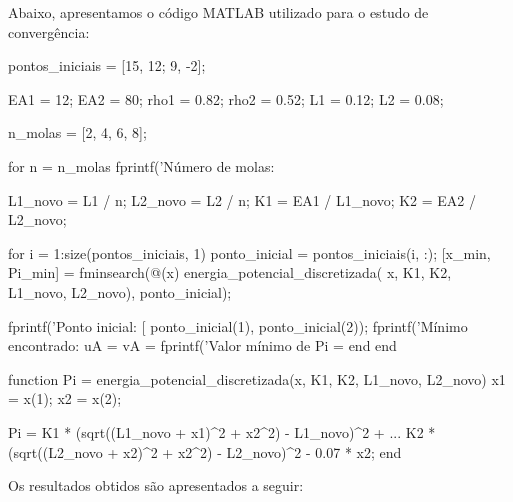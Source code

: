 \documentclass[a4paper, 12pt]{article}
\begin{document}
Abaixo, apresentamos o código MATLAB utilizado para o estudo de convergência:

\sloppy
{}
\graphicspath{ {./L01_Latex_images/} }
\begin{matlabcode}

pontos_iniciais = [15, 12; 9, -2];

EA1 = 12; %
EA2 = 80; %
rho1 = 0.82; %
rho2 = 0.52; %
L1 = 0.12; %
L2 = 0.08; %

n_molas = [2, 4, 6, 8];

for n = n_molas
    fprintf('Número de molas: %
    
    L1_novo = L1 / n;
    L2_novo = L2 / n;
    K1 = EA1 / L1_novo;
    K2 = EA2 / L2_novo;
    
    for i = 1:size(pontos_iniciais, 1)
        ponto_inicial = pontos_iniciais(i, :);
        [x_min, Pi_min] = fminsearch(@(x) energia_potencial_discretizada(
        x, K1, K2, L1_novo, L2_novo), 
        ponto_inicial);
        
        fprintf('Ponto inicial: [%
        ponto_inicial(1), ponto_inicial(2));
        fprintf('Mínimo encontrado: uA = %
        vA = %
        fprintf('Valor mínimo de Pi = %
    end
end

function Pi = energia_potencial_discretizada(x, K1, K2, L1_novo, L2_novo)
    x1 = x(1);
    x2 = x(2);
    
    Pi = K1 * (sqrt((L1_novo + x1)^2 + x2^2) - L1_novo)^2 + ...
         K2 * (sqrt((L2_novo + x2)^2 + x2^2) - L2_novo)^2 - 0.07 * x2;
end



\end{matlabcode}


Os resultados obtidos são apresentados a seguir:
\end{document}
